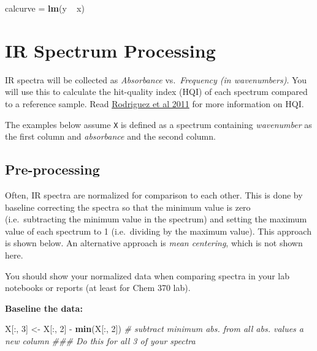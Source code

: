 \documentclass[]{tufte-book}
\newenvironment{Shaded}{}{}
\newcommand{\CommentTok}[1]{\textcolor[rgb]{0.38,0.63,0.69}{\textit{#1}}}
\newcommand{\DecValTok}[1]{\textcolor[rgb]{0.25,0.63,0.44}{#1}}
\newcommand{\KeywordTok}[1]{\textcolor[rgb]{0.00,0.44,0.13}{\textbf{#1}}}
\newcommand{\NormalTok}[1]{#1}
\newcommand{\OperatorTok}[1]{\textcolor[rgb]{0.40,0.40,0.40}{#1}}
\newcommand{\StringTok}[1]{\textcolor[rgb]{0.25,0.44,0.63}{#1}}
\begin{document}
\begin{Shaded}
\begin{Highlighting}[]
\NormalTok{calcurve =}\StringTok{ }\KeywordTok{lm}\NormalTok{(y }\OperatorTok{~}\StringTok{ }\NormalTok{x)}
\end{Highlighting}
\end{Shaded}

\hypertarget{ir-spectrum-processing}{%
\section*{IR Spectrum Processing}\label{ir-spectrum-processing}}

IR spectra will be collected as \emph{Absorbance} vs.~\emph{Frequency (in wavenumbers)}. You will use this to calculate the hit-quality index (HQI) of each spectrum compared to a reference sample. Read \href{https://www.researchgate.net/publication/51602215_Standardization_of_Raman_spectra_for_transfer_of_spectral_libraries_across_different_instruments}{Rodriguez et al 2011} for more information on HQI.

The examples below assume \texttt{X} is defined as a spectrum containing \emph{wavenumber} as the first column and \emph{absorbance} and the second column.

\hypertarget{pre-processing}{%
\subsection*{Pre-processing}\label{pre-processing}}

Often, IR spectra are normalized for comparison to each other. This is done by baseline correcting the spectra so that the minimum value is zero (i.e.~subtracting the minimum value in the spectrum) and setting the maximum value of each spectrum to 1 (i.e.~dividing by the maximum value). This approach is shown below. An alternative approach is \emph{mean centering}, which is not shown here.

You should show your normalized data when comparing spectra in your lab notebooks or reports (at least for Chem 370 lab).

\textbf{Baseline the data:}

\begin{Shaded}
\begin{Highlighting}[]
\NormalTok{X[}\OperatorTok{:}\NormalTok{, }\DecValTok{3}\NormalTok{] <-}\StringTok{ }\NormalTok{X[}\OperatorTok{:}\NormalTok{, }\DecValTok{2}\NormalTok{] }\OperatorTok{-}\StringTok{ }\KeywordTok{min}\NormalTok{(X[}\OperatorTok{:}\NormalTok{, }\DecValTok{2}\NormalTok{])  }\CommentTok{# subtract minimum abs. from all abs. values a new column}
\CommentTok{### Do this for all 3 of your spectra}
\end{Highlighting}
\end{Shaded}
\end{document}
